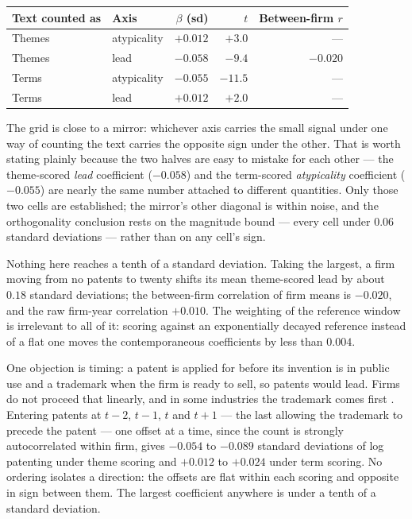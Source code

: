 \begin{center}\small
\begin{tabular}{llrrr}
\toprule
Text counted as & Axis & $\beta$ (sd) & $t$ & Between-firm $r$ \\
\midrule
Themes & atypicality & $+0.012$ & $+3.0$ & --- \\
Themes & lead        & $-0.058$ & $-9.4$ & $-0.020$ \\
Terms  & atypicality & $-0.055$ & $-11.5$ & --- \\
Terms  & lead        & $+0.012$ & $+2.0$ & --- \\
\bottomrule
\end{tabular}
\end{center}

\noindent The grid is close to a mirror: whichever axis carries the small
signal under one way of counting the text carries the opposite sign under the
other. That is worth stating plainly because the two halves are easy to
mistake for each other --- the theme-scored \emph{lead} coefficient
($-0.058$) and the term-scored \emph{atypicality} coefficient ($-0.055$) are
nearly the same number attached to different quantities. Only those two
cells are established; the mirror's other diagonal is within noise, and the
orthogonality conclusion rests on the magnitude bound --- every cell under
$0.06$ standard deviations --- rather than on any cell's sign.

Nothing here reaches a tenth of a standard deviation. Taking the largest, a
firm moving from no patents to twenty shifts its mean theme-scored lead by
about $0.18$ standard deviations; the between-firm correlation of firm
means is $-0.020$, and the raw firm-year correlation $+0.010$. The weighting of the reference window is irrelevant to all of it:
scoring against an exponentially decayed reference instead of a flat one moves
the contemporaneous coefficients by less than $0.004$.

One objection is timing: a patent is applied for before its invention is in public use and a trademark when the firm is ready
to sell, so patents would lead. Firms do not proceed that linearly, and in
some industries the trademark comes first \citep{Seip2018}. Entering patents
at $t-2$, $t-1$, $t$ and $t+1$ --- the last allowing the trademark to
precede the patent --- one offset at a time, since the count is strongly
autocorrelated within firm, gives $-0.054$ to $-0.089$ standard deviations of log patenting under theme
scoring and $+0.012$ to $+0.024$ under term scoring. No ordering isolates a
direction: the offsets are flat within each scoring and opposite in
sign between them. The largest coefficient anywhere is under a tenth of a
standard deviation.

